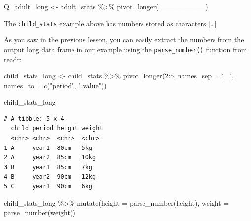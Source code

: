 \documentclass[
  letterpaper,
  DIV=11,
  numbers=noendperiod]{scrreprt}
\newenvironment{Shaded}{\begin{snugshade}}{\end{snugshade}}
\newcommand{\AttributeTok}[1]{\textcolor[rgb]{0.40,0.45,0.13}{#1}}
\newcommand{\DecValTok}[1]{\textcolor[rgb]{0.68,0.00,0.00}{#1}}
\newcommand{\FunctionTok}[1]{\textcolor[rgb]{0.28,0.35,0.67}{#1}}
\newcommand{\NormalTok}[1]{\textcolor[rgb]{0.00,0.23,0.31}{#1}}
\newcommand{\OtherTok}[1]{\textcolor[rgb]{0.00,0.23,0.31}{#1}}
\newcommand{\SpecialCharTok}[1]{\textcolor[rgb]{0.37,0.37,0.37}{#1}}
\newcommand{\StringTok}[1]{\textcolor[rgb]{0.13,0.47,0.30}{#1}}
\begin{document}
\begin{tcolorbox}
\begin{Shaded}
\begin{Highlighting}[]
\NormalTok{Q\_adult\_long }\OtherTok{\textless{}{-}}
\NormalTok{  adult\_stats }\SpecialCharTok{\%\textgreater{}\%}
  \FunctionTok{pivot\_longer}\NormalTok{(\_\_\_\_\_\_\_\_\_)}
\end{Highlighting}
\end{Shaded}

\end{tcolorbox}

\begin{tcolorbox}[enhanced jigsaw, titlerule=0mm, colback=white, left=2mm, breakable, opacitybacktitle=0.6, colbacktitle=quarto-callout-note-color!10!white, colframe=quarto-callout-note-color-frame, bottomtitle=1mm, opacityback=0, coltitle=black, arc=.35mm, toptitle=1mm, title=\textcolor{quarto-callout-note-color}{\faInfo}\hspace{0.5em}{Side Note}, leftrule=.75mm, toprule=.15mm, bottomrule=.15mm, rightrule=.15mm]

The \texttt{child\_stats} example above has numbers stored as characters
{[}\ldots{]}

As you saw in the previous lesson, you can easily extract the numbers
from the output long data frame in our example using the
\texttt{parse\_number()} function from readr:

\begin{Shaded}
\begin{Highlighting}[]
\NormalTok{child\_stats\_long }\OtherTok{\textless{}{-}} 
\NormalTok{  child\_stats }\SpecialCharTok{\%\textgreater{}\%} 
  \FunctionTok{pivot\_longer}\NormalTok{(}\DecValTok{2}\SpecialCharTok{:}\DecValTok{5}\NormalTok{, }
               \AttributeTok{names\_sep =} \StringTok{"\_"}\NormalTok{,}
               \AttributeTok{names\_to =} \FunctionTok{c}\NormalTok{(}\StringTok{"period"}\NormalTok{, }\StringTok{".value"}\NormalTok{))}

\NormalTok{child\_stats\_long}
\end{Highlighting}
\end{Shaded}

\begin{verbatim}
# A tibble: 5 x 4
  child period height weight
  <chr> <chr>  <chr>  <chr> 
1 A     year1  80cm   5kg   
2 A     year2  85cm   10kg  
3 B     year1  85cm   7kg   
4 B     year2  90cm   12kg  
5 C     year1  90cm   6kg   
\end{verbatim}

\begin{Shaded}
\begin{Highlighting}[]
\NormalTok{child\_stats\_long }\SpecialCharTok{\%\textgreater{}\%} 
  \FunctionTok{mutate}\NormalTok{(}\AttributeTok{height =} \FunctionTok{parse\_number}\NormalTok{(height), }
         \AttributeTok{weight =} \FunctionTok{parse\_number}\NormalTok{(weight))}
\end{Highlighting}
\end{Shaded}


\end{tcolorbox}
\end{document}
